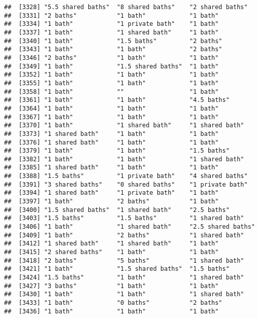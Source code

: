 \documentclass[
]{article}
\begin{document}
\begin{verbatim}
##  [3328] "5.5 shared baths"  "8 shared baths"    "2 shared baths"   
##  [3331] "2 baths"           "1 bath"            "1 bath"           
##  [3334] "1 bath"            "1 private bath"    "1 bath"           
##  [3337] "1 bath"            "1 shared bath"     "1 bath"           
##  [3340] "1 bath"            "1.5 baths"         "2 baths"          
##  [3343] "1 bath"            "1 bath"            "2 baths"          
##  [3346] "2 baths"           "1 bath"            "1 bath"           
##  [3349] "1 bath"            "1.5 shared baths"  "1 bath"           
##  [3352] "1 bath"            "1 bath"            "1 bath"           
##  [3355] "1 bath"            "1 bath"            "1 bath"           
##  [3358] "1 bath"            ""                  "1 bath"           
##  [3361] "1 bath"            "1 bath"            "4.5 baths"        
##  [3364] "1 bath"            "1 bath"            "1 bath"           
##  [3367] "1 bath"            "1 bath"            "1 bath"           
##  [3370] "1 bath"            "1 shared bath"     "1 shared bath"    
##  [3373] "1 shared bath"     "1 bath"            "1 bath"           
##  [3376] "1 shared bath"     "1 bath"            "1 bath"           
##  [3379] "1 bath"            "1 bath"            "1.5 baths"        
##  [3382] "1 bath"            "1 bath"            "1 shared bath"    
##  [3385] "1 shared bath"     "1 bath"            "1 bath"           
##  [3388] "1.5 baths"         "1 private bath"    "4 shared baths"   
##  [3391] "3 shared baths"    "0 shared baths"    "1 private bath"   
##  [3394] "1 shared bath"     "1 private bath"    "1 bath"           
##  [3397] "1 bath"            "2 baths"           "1 bath"           
##  [3400] "1.5 shared baths"  "1 shared bath"     "2.5 baths"        
##  [3403] "1.5 baths"         "1.5 baths"         "1 shared bath"    
##  [3406] "1 bath"            "1 shared bath"     "2.5 shared baths" 
##  [3409] "1 bath"            "2 baths"           "1 shared bath"    
##  [3412] "1 shared bath"     "1 shared bath"     "1 bath"           
##  [3415] "2 shared baths"    "1 bath"            "1 bath"           
##  [3418] "2 baths"           "5 baths"           "1 shared bath"    
##  [3421] "1 bath"            "1.5 shared baths"  "1.5 baths"        
##  [3424] "1.5 baths"         "1 bath"            "1 shared bath"    
##  [3427] "3 baths"           "1 bath"            "1 bath"           
##  [3430] "1 bath"            "1 bath"            "1 shared bath"    
##  [3433] "1 bath"            "0 baths"           "2 baths"          
##  [3436] "1 bath"            "1 bath"            "1 bath"           

\end{verbatim}
\end{document}
